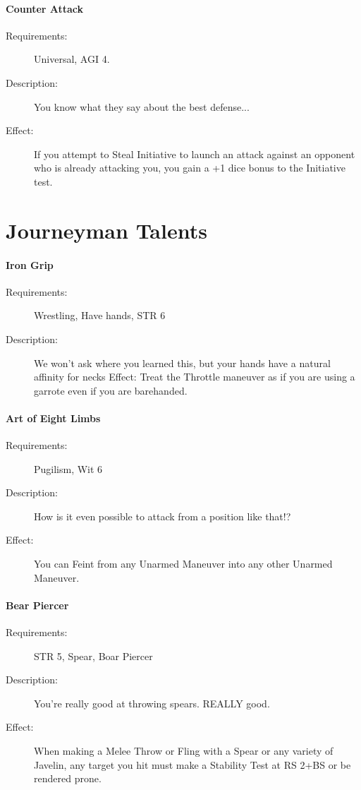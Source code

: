 \documentclass[oneside,11pt,english]{book}
\begin{document}
\paragraph{Counter Attack}\label{talent:Counter Attack}
\begin{description}
\item [Requirements:] Universal, AGI 4. 
\item [Description:] You know what they say about the best defense... 
\item [Effect:] If you attempt to Steal Initiative to launch an attack against an opponent who is already attacking you, you gain a +1 dice bonus to the Initiative test.
\end{description}

\section{Journeyman Talents}\label{sec:Journeyman Talents}

\paragraph{Iron Grip}\label{talent:iron-grip}
\begin{description}
\item [ Requirements: ] Wrestling, Have hands, STR 6
\item [ Description: ] We won’t ask where you learned this, but your hands have
  a natural affinity for necks Effect: Treat the Throttle maneuver as if you are
  using a garrote even if you are bare­handed.
\end{description}

\paragraph{\label{talent:Art of Eight Limbs}Art of Eight Limbs}
\begin{description}
\item [Requirements:] Pugilism, Wit 6 
\item [Description:] How is it even possible to attack from a position like that!? 
\item [Effect:] You can Feint from any Unarmed Maneuver into any other Unarmed Maneuver. 
\end{description}

\paragraph{\label{talent:Bear Piercer}Bear Piercer}
\begin{description}
\item [Requirements:] STR 5, Spear, Boar Piercer 
\item [Description:] You’re really good at throwing spears. REALLY good. 
\item [Effect:] When making a Melee Throw or Fling with a Spear or any variety of Javelin, any target you hit must make a Stability Test at RS 2+BS or be rendered prone. 
\end{description}
\end{document}
